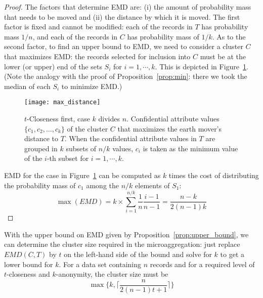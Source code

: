 \documentclass[10pt,journal,compsoc]{IEEEtran}
\theoremstyle{definition}
\theoremstyle{plain}
\begin{document}
\begin{proof}
The factors that determine EMD are: (i) the amount of probability
	mass that needs to be moved and (ii) the distance by which it is
moved. The first factor
	is fixed and cannot be modified: each of the records in $T$ has probability
	mass $1/n$, and each of the records in $C$ has probability mass
	of $1/k$. As to the second factor, to find an upper bound to 
	EMD, we need to consider a cluster $C$ that maximizes EMD: the
	records selected for inclusion 
into $C$ must be at the lower (or upper) end 
	of the sets $S_{i}$ for $i=1, \cdots, k$. 
This is depicted in Figure~\ref{fig:max_distance}.
(Note the analogy with the proof of Proposition~\ref{prop:min}: there we 
took the median of each $S_i$ to minimize EMD.)
	
	\begin{figure}[!t]
		\begin{centering}
			\texttt{[image: max\_distance]}
			
			\par\end{centering}
		\hfil
\protect\caption{$t$-Closeness first, case $k$ divides $n$. Confidential attribute values $\{c_{1},c_{2},\ldots,c_{k}\}$
			of the cluster $C$ that maximizes the earth mover's distance to $T$. 
When the confidential
			attribute values in $T$ are grouped in $k$ subsets of $n/k$ values, $c_i$ is taken as the minimum value of the $i$-th subset for 
$i=1,\cdots,k$.  \label{fig:max_distance}}
	\end{figure}
	
	EMD for the case in Figure~\ref{fig:max_distance} can be computed
	as $k$ times the cost of distributing the probability mass of $c_{1}$
	among the $n/k$ elements of $S_{1}$:
\begin{equation}
\label{maxEMD}
\max(EMD)=k\times\sum_{i=1}^{n/k}\frac{1}{n}\frac{i-1}{n-1}=\frac{n-k}{2(n-1)k}
\end{equation}
\end{proof}

With the upper bound on EMD given by Proposition~\ref{prop:upper_bound},
we can determine the cluster size required in the microaggregation:
just replace $EMD(C,T)$ by $t$ on the left-hand side of the bound
and solve for $k$ to get a lower bound for $k$.
For a data set containing $n$ records and for a required level of
$t$-closeness and $k$-anonymity, the cluster size must be
\begin{equation}
\max\{k,\lceil\frac{n}{2(n-1)t+1}\rceil\}\label{eq:cluster_size}
\end{equation}
\end{document}
